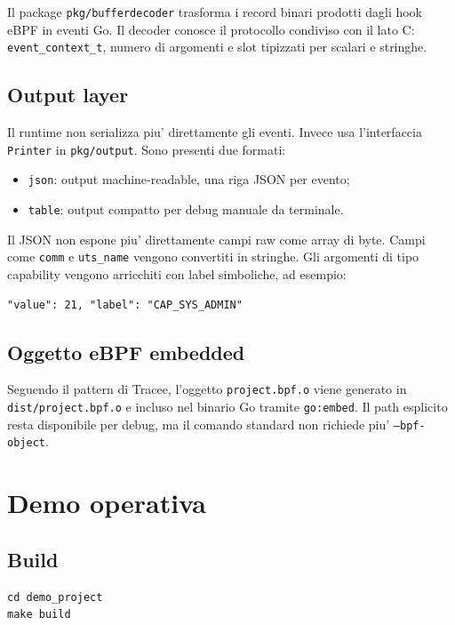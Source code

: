 \documentclass[11pt,a4paper]{article}
\begin{document}
Il package \texttt{pkg/bufferdecoder} trasforma i record binari prodotti dagli
hook eBPF in eventi Go. Il decoder conosce il protocollo condiviso con il lato C:
\texttt{event\_context\_t}, numero di argomenti e slot tipizzati per scalari e
stringhe.

\subsection{Output layer}

Il runtime non serializza piu' direttamente gli eventi. Invece usa
l'interfaccia \texttt{Printer} in \texttt{pkg/output}. Sono presenti due formati:

\begin{itemize}
  \item \texttt{json}: output machine-readable, una riga JSON per evento;
  \item \texttt{table}: output compatto per debug manuale da terminale.
\end{itemize}

Il JSON non espone piu' direttamente campi raw come array di byte. Campi come
\texttt{comm} e \texttt{uts\_name} vengono convertiti in stringhe. Gli argomenti
di tipo capability vengono arricchiti con label simboliche, ad esempio:

\begin{lstlisting}[style=terminal]
"value": 21, "label": "CAP_SYS_ADMIN"
\end{lstlisting}

\subsection{Oggetto eBPF embedded}

Seguendo il pattern di Tracee, l'oggetto \texttt{project.bpf.o} viene generato
in \texttt{dist/project.bpf.o} e incluso nel binario Go tramite
\texttt{go:embed}. Il path esplicito resta disponibile per debug, ma il comando
standard non richiede piu' \texttt{--bpf-object}.

\section{Demo operativa}

\subsection{Build}

\begin{lstlisting}[style=terminal]
cd demo_project
make build
\end{lstlisting}
\end{document}
